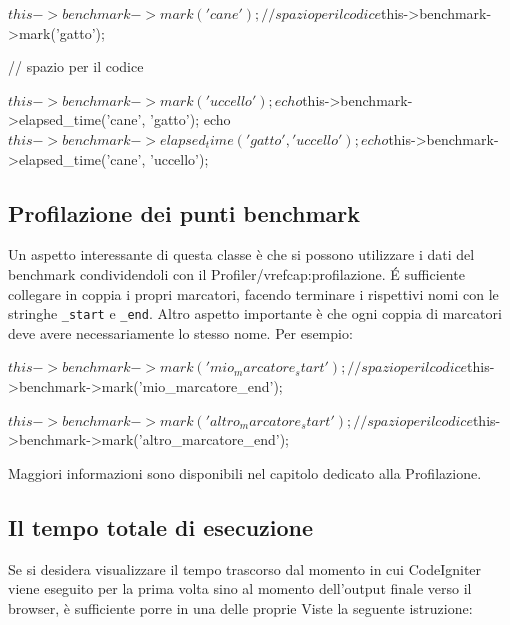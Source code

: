 \begin{code}
$this->benchmark->mark('cane');

// spazio per il codice

$this->benchmark->mark('gatto');

// spazio per il codice

$this->benchmark->mark('uccello');

echo $this->benchmark->elapsed_time('cane', 'gatto');
echo $this->benchmark->elapsed_time('gatto', 'uccello');
echo $this->benchmark->elapsed_time('cane', 'uccello');
\end{code}

\subsection*{Profilazione dei punti benchmark}
Un aspetto interessante di questa classe è che si possono utilizzare i dati del benchmark condividendoli con il Profiler/vref{cap:profilazione}. \'E sufficiente collegare in coppia i propri marcatori, facendo terminare i rispettivi nomi con le stringhe \verb|_start| e \verb|_end|. Altro aspetto importante è che ogni coppia di marcatori deve avere necessariamente lo stesso nome. Per esempio:

\begin{code}
$this->benchmark->mark('mio_marcatore_start');

// spazio per il codice

$this->benchmark->mark('mio_marcatore_end'); 

$this->benchmark->mark('altro_marcatore_start');

// spazio per il codice

$this->benchmark->mark('altro_marcatore_end');
\end{code}

Maggiori informazioni sono disponibili nel capitolo dedicato alla Profilazione.

\subsection*{Il tempo totale di esecuzione}
Se si desidera visualizzare il tempo trascorso dal momento in cui CodeIgniter viene eseguito per la prima volta sino al momento dell'output finale verso il browser, è sufficiente porre in una delle proprie Viste la seguente istruzione:


